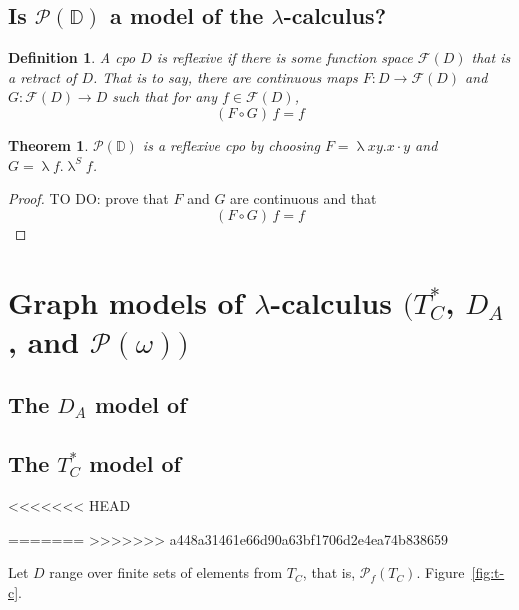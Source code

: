 \documentclass{tufte-handout}
\newtheorem{theorem}{Theorem}%
\newtheorem{definition}{Definition}%
\begin{document}
\subsection{Is $\mathcal{P}(\mathbb{D})$ a model of the $\lambda$-calculus?}


\begin{definition}
  A cpo $D$ is \emph{reflexive} if there is some function space
  $\mathcal{F}(D)$ that is a retract of $D$.  That is to say, there
  are continuous maps $F:D \to \mathcal{F}(D)$ and $G: \mathcal{F}(D)
  \to D $ such that for any $f \in \mathcal{F}(D)$,
  \[
    (F \circ G)\, f = f
  \]
\end{definition}


\begin{theorem}
  $\mathcal{P}(\mathbb{D})$ is a reflexive cpo by
  choosing $F=\uplambda x y. x \cdot y$ and
  $G=\uplambda f. \uplambda^S f$.

\end{theorem}
\begin{proof}
  TO DO: prove that $F$ and $G$ are continuous and that
  \[
  (F \circ G)\, f = f
  \]
\end{proof}



\section{Graph models of $\lambda$-calculus $(T^{*}_C$, $D_A$, and $\mathcal{P}(\omega))$ }
\label{sec:graph-models}


\subsection{The $D_A$ model of \citet{Engeler:1981aa}}
\label{sec:d-a}

\newcommand{\EP}[0]{\mathcal{E}_E}
\newcommand{\ESEM}[1]{\EE\, #1 \,}



\subsection{The $T^{*}_C$ model of \citet{Plotkin:1972aa}}
\label{sec:t-c}

<<<<<<< HEAD
\newcommand{\EP}[0]{\mathcal{E}_P}
\newcommand{\PSEM}[1]{\EP\,#1\,}

=======
\newcommand{\PSEM}[1]{E_P\,#1\,}
>>>>>>> a448a31461e66d90a63bf1706d2e4ea74b838659


  Let $D$ range over finite sets of elements from $T_C$, that is,
  $\mathcal{P}_f(T_C)$.
  Figure~\ref{fig:t-c}.
  
\end{document}
